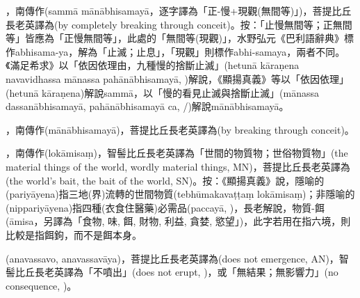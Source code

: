 \startitemgroup[noteitems]
\item{}，南傳作(sammā mānābhisamayā，逐字譯為「正-慢+現觀(無間等)」)，菩提比丘長老英譯為(by completely breaking through conceit)。按：「止慢無間等；正無間等」皆應為「正慢無間等」，此處的「無間等(現觀)」，水野弘元《巴利語辭典》標作abhisama-ya，解為「止滅；止息」，「現觀」則標作abhi-samaya，兩者不同。《滿足希求》以「依因依理由，九種慢的捨斷止滅」(hetunā kāraṇena navavidhassa mānassa pahānābhisamayā, )解說，《顯揚真義》等以「依因依理」(hetunā kāraṇena)解說sammā，以「慢的看見止滅與捨斷止滅」(mānassa dassanābhisamayā, pahānābhisamayā ca, /)解說mānābhisamayā。
\item{}，南傳作(mānābhisamayā)，菩提比丘長老英譯為(by breaking through conceit)。
\stopitemgroup

\startitemgroup[noteitems]
\item{}，南傳作(lokāmisaṃ)，智髻比丘長老英譯為「世間的物質物；世俗物質物」(the material things of the world, wordly material things, MN)，菩提比丘長老英譯為(the world's bait, the bait of the world, SN)。按：《顯揚真義》說，隱喻的(pariyāyena)指三地(界)流轉的世間物質(tebhūmakavaṭṭaṃ lokāmisaṃ)；非隱喻的(nippariyāyena)指四種(衣食住醫藥)必需品(paccayā, )，長老解說，物質-餌(āmisa，另譯為「食物, 味, 餌, 財物, 利益, 貪婪, 慾望」)，此字若用在指六境，則比較是指餌鉤，而不是餌本身。
\stopitemgroup

\startitemgroup[noteitems]
\item{}(anavassavo, anavassavāya)，菩提比丘長老英譯為(does not emergence, AN)，智髻比丘長老英譯為「不噴出」(does not erupt, )，或「無結果；無影響力」(no consequence, )。
\stopitemgroup


